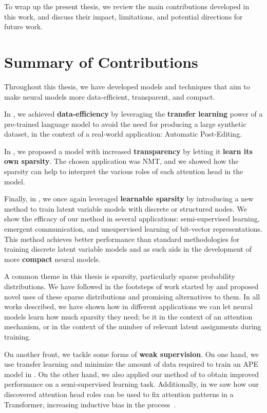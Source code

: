 \label{chap:conclusions}

\cleardoublepage
\doublespacing

\noindent To wrap up the present thesis, we review the main contributions
developed in this work, and discuss their impact, limitations, and
potential directions for future work.

\section{Summary of Contributions}

\noindent Throughout this thesis, we have developed models and
techniques that aim to make neural models more data-efficient, transparent,
and compact.

In , we achieved \textbf{data-efficiency} by
leveraging the \textbf{transfer learning} power of a pre-trained
language model to avoid the need for producing a large synthetic
dataset, in the context of a real-world application: Automatic
Post-Editing.

In , we proposed a model with increased
\textbf{transparency} by letting it \textbf{learn its own sparsity}.
The chosen application was NMT, and we showed
how the sparsity can help to interpret the various roles of each
attention head in the model.

Finally, in , we once again leveraged
\textbf{learnable sparsity} by introducing a new method to train
latent variable models with discrete or structured nodes. We show the
efficacy of our method in several applications: semi-supervised
learning, emergent communication, and unsupervised learning of
bit-vector representations. This method achieves better performance
than standard methodologies for training discrete latent variable
models and as such aids in the development of more \textbf{compact}
neural models.

A common theme in this thesis is sparsity, particularly
sparse probability distributions. We have followed in the footsteps
of work started by \citet{sparsemax} and proposed novel uses of
these sparse distributions and promising alternatives to them.
In all works described, we have shown how in different applications
we can let neural models learn how much sparsity they need; be it
in the context of an attention mechanism, or in the context of
the number of relevant latent assignments during training.

On another front, we tackle some forms of \textbf{weak supervision}.
On one hand, we use transfer learning and minimize the amount of data
required to train an APE model in . On the other
hand, we also applied our method of  to
obtain improved performance on a semi-supervised learning task.
Additionally, in  we saw how our
discovered attention head roles can be used to fix attention patterns
in a Transformer, increasing inductive bias in the
process~\citep{raganato2020FixedEncoderSelfAttentiona}.

